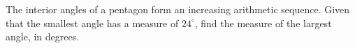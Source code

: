 The interior angles of a pentagon form an increasing arithmetic sequence. Given that the smallest angle has a measure of $24^{\circ}$, find the measure of the largest angle, in degrees.
